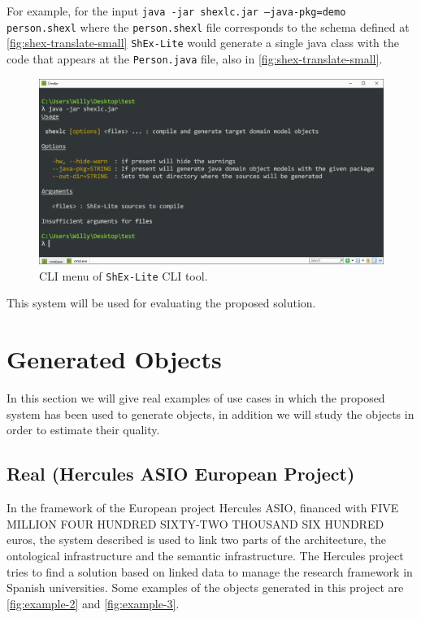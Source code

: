 For example, for the input \texttt{java -jar shexlc.jar --java-pkg=demo person.shexl} where the \texttt{person.shexl}
file corresponds to the schema defined at \cref{fig:shex-translate-small} \texttt{ShEx-Lite} would generate a single java
class with the code that appears at the \texttt{Person.java} file, also in \cref{fig:shex-translate-small}.

\begin{figure}
    \includegraphics[width=\textwidth]{images/shexlc-menu.PNG}
    \centering
	\caption[CLI menu of \texttt{ShEx-Lite} CLI tool]{CLI menu of \texttt{ShEx-Lite} CLI tool.}
    \label{fig:menu-tool}
\end{figure}

This system
will be used for evaluating the proposed solution.

\section{Generated Objects}
In this section we will give real examples of use cases in which the proposed system has been used to generate objects,
in addition we will study the objects in order to estimate their quality.

\subsection{Real (Hercules ASIO European Project)}
In the framework of the European project Hercules ASIO, financed with FIVE MILLION FOUR HUNDRED SIXTY-TWO THOUSAND SIX HUNDRED
euros, the system described is used to link two parts of the architecture, the ontological infrastructure and the semantic 
infrastructure. The Hercules project tries to find a solution based on linked data to manage the research framework
in Spanish universities. Some examples of the objects generated in this project are \cref{fig:example-2} and \cref{fig:example-3}.

